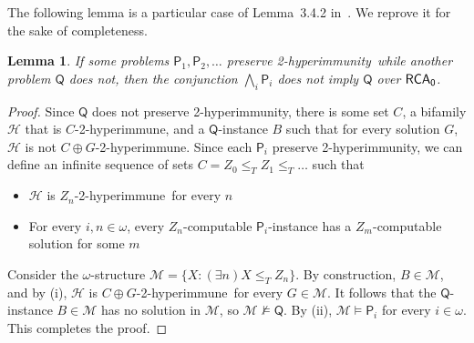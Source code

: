 \documentclass{amsart}
\newtheorem{lemma}[theorem]{Lemma}
\theoremstyle{definition}
\theoremstyle{remark}
\numberwithin{equation}{section}
\theoremstyle{noparens}
\def\propertyL{2-hyperimmunity}
\def\hyper{2-hyperimmune}
\newcommand{\Psf}{\mathsf{P}}
\newcommand{\Qsf}{\mathsf{Q}}
\newcommand{\Hcal}{\mathcal{H}}
\newcommand{\Mcal}{\mathcal{M}}
\newcommand{\s}[1]{\ensuremath{\sf{#1}}}
\DeclareMathOperator{\rca}{\s{RCA}_0}
\begin{document}
The following lemma is a particular case of Lemma~3.4.2 in~\cite{Patey2016reverse}.
We reprove it for the sake of  completeness.

\begin{lemma}\label{lem:transformtopreservation}
If some problems $\Psf_1, \Psf_2, \dots$ preserve \propertyL\
while another problem $\Qsf$ does not, then the conjunction $\bigwedge_i \Psf_i$
does not imply $\Qsf$ over $\rca$.
\end{lemma}
\begin{proof}
Since $\Qsf$ does not preserve \propertyL, there is some set $C$,
a bifamily $\Hcal$ that is $C$-\hyper, and a $\Qsf$-instance $B$
such that for every solution $G$, $\Hcal$ is not $C \oplus G$-\hyper.
Since each $\Psf_i$ preserve \propertyL, we can define an infinite
sequence of sets $C = Z_0 \leq_T Z_1 \leq_T \dots$ such that
\begin{itemize}
	\item[(i)] $\Hcal$ is $Z_n$-\hyper\ for every $n$
	\item[(ii)] For every $i, n \in \omega$, every $Z_n$-computable
		$\Psf_i$-instance has a $Z_m$-computable solution for some $m$
\end{itemize}
Consider the $\omega$-structure $\Mcal = \{ X : (\exists n) X \leq_T Z_n \}$.
By construction, $B \in \Mcal$,
and by (i), $\Hcal$ is $C \oplus G$-\hyper\ for every $G \in \Mcal$.
It follows that the $\Qsf$-instance $B \in \Mcal$ has no solution in $\Mcal$, so $\Mcal \not \models \Qsf$.
By (ii), $\Mcal \models \Psf_i$ for every $i \in \omega$. This completes the proof.
\end{proof}
\end{document}
